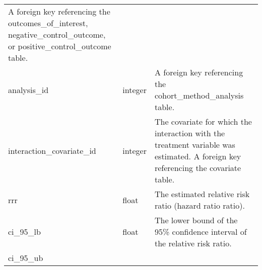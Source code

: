 \documentclass[
]{article}
\begin{document}
\begin{longtable}[]{@{}lll@{}}
\begin{minipage}[t]{0.50\columnwidth}
A foreign key referencing the outcomes\_of\_interest,
negative\_control\_outcome, or positive\_control\_outcome table.\strut
\end{minipage}\tabularnewline
\begin{minipage}[t]{0.23\columnwidth}\raggedright
analysis\_id\strut
\end{minipage} & \begin{minipage}[t]{0.18\columnwidth}\raggedright
integer\strut
\end{minipage} & \begin{minipage}[t]{0.50\columnwidth}\raggedright
A foreign key referencing the cohort\_method\_analysis table.\strut
\end{minipage}\tabularnewline
\begin{minipage}[t]{0.23\columnwidth}\raggedright
interaction\_covariate\_id\strut
\end{minipage} & \begin{minipage}[t]{0.18\columnwidth}\raggedright
integer\strut
\end{minipage} & \begin{minipage}[t]{0.50\columnwidth}\raggedright
The covariate for which the interaction with the treatment variable was
estimated. A foreign key referencing the covariate table.\strut
\end{minipage}\tabularnewline
\begin{minipage}[t]{0.23\columnwidth}\raggedright
rrr\strut
\end{minipage} & \begin{minipage}[t]{0.18\columnwidth}\raggedright
float\strut
\end{minipage} & \begin{minipage}[t]{0.50\columnwidth}\raggedright
The estimated relative risk ratio (hazard ratio ratio).\strut
\end{minipage}\tabularnewline
\begin{minipage}[t]{0.23\columnwidth}\raggedright
ci\_95\_lb\strut
\end{minipage} & \begin{minipage}[t]{0.18\columnwidth}\raggedright
float\strut
\end{minipage} & \begin{minipage}[t]{0.50\columnwidth}\raggedright
The lower bound of the 95\% confidence interval of the relative risk
ratio.\strut
\end{minipage}\tabularnewline
\begin{minipage}[t]{0.23\columnwidth}\raggedright
ci\_95\_ub\strut
\end{minipage} & \begin{minipage}[t]{0.18\columnwidth}\raggedright

\end{minipage}
\end{longtable}
\end{document}
